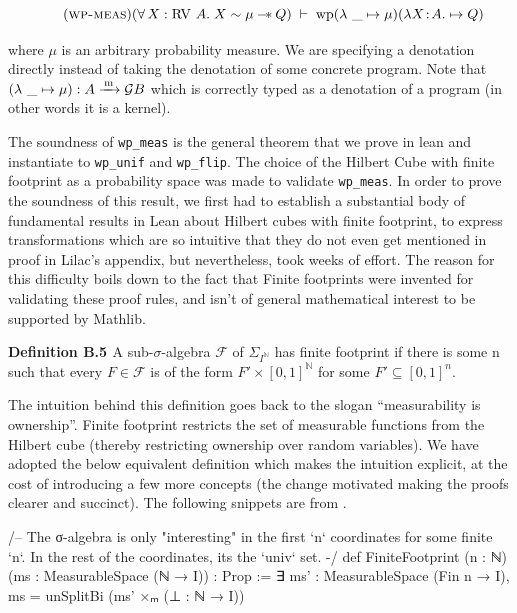 \[
\tag{\textsc{wp-meas}}
(\forall\, X : \RV A.\; X \sim \mu \wand Q)
\;\vdash\;
\mathrm{wp} (\lambda\ \_ \mapsto \mu) ( \lambda X\!:\!A.\mapsto Q)
\]

where $\mu$ is an arbitrary probability measure. We are specifying a denotation directly instead of taking the denotation of some concrete program.
Note that $(\lambda\ \_ \mapsto \mu) : A \xrightarrow{\,\mathrm{m}\,} \mathcal{G} B$ which is correctly typed as a denotation of a program
(in other words it is a kernel).

The soundness of \texttt{wp\_meas} is the general theorem that we prove in lean and instantiate to \texttt{wp\_unif} and \texttt{wp\_flip}. The choice of the Hilbert Cube
with finite footprint as a probability space was made to validate \texttt{wp\_meas}. In order to prove the soundness of this result, we first had to establish a
substantial body of fundamental results in Lean about Hilbert cubes with finite footprint, to express transformations which are so intuitive that they do
not even get mentioned in proof in Lilac's appendix, but nevertheless, took weeks of effort. The reason for this difficulty boils down to the fact that Finite footprints
were invented for validating these proof rules, and isn't of general mathematical interest to be supported by Mathlib.

\textbf{Definition B.5 \citep[Appendix B]{lilac}} A sub-$\sigma$-algebra $\mathcal{F}$ of $\Sigma_{I^\mathbb{N}}$ has finite footprint if there is some n such that every $F \in \mathcal{F}$
is of the form $F' \times [0,1]^\mathbb{N}$ for some $F' \subseteq [0,1]^n$.

The intuition behind this definition goes back to the slogan ``measurability is ownership''. Finite footprint restricts the set of measurable functions from the
Hilbert cube (thereby restricting ownership over random variables). We have adopted the below equivalent definition which makes the intuition explicit, at the cost of
introducing a few more concepts (the change motivated making the proofs clearer and succinct). The following snippets are from .

\begin{leancode}
/-- The σ-algebra is only "interesting" in the first `n` coordinates for
some finite `n`.  In the rest of the coordinates, its the `univ` set. -/
def FiniteFootprint (n : ℕ) (ms : MeasurableSpace (ℕ → I)) : Prop :=
  ∃ ms' : MeasurableSpace (Fin n → I), ms = unSplitBi (ms' ×ₘ (⊥ : ℕ → I))
\end{leancode}

